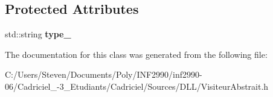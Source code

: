 \subsection*{Protected Attributes}
\begin{DoxyCompactItemize}
\item 
\hypertarget{class_visiteur_abstrait_a89cf9b9e3c1f2fe93d04d8640a2662c4}{}\label{class_visiteur_abstrait_a89cf9b9e3c1f2fe93d04d8640a2662c4} 
std\+::string {\bfseries type\+\_\+}
\end{DoxyCompactItemize}


The documentation for this class was generated from the following file\+:\begin{DoxyCompactItemize}
\item 
C\+:/\+Users/\+Steven/\+Documents/\+Poly/\+I\+N\+F2990/inf2990-\/06/\+Cadriciel\+\_-\/3\+\_\+\+Etudiants/\+Cadriciel/\+Sources/\+D\+L\+L/Visiteur\+Abstrait.\+h\end{DoxyCompactItemize}
